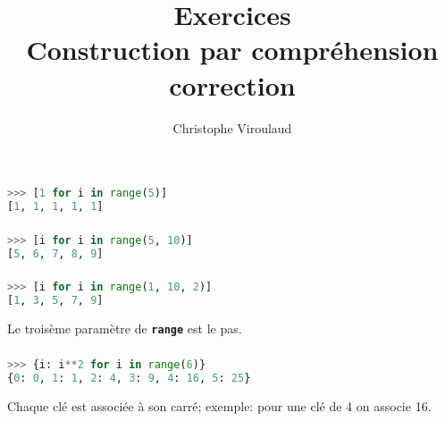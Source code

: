 \documentclass[svgnames,11pt]{beamer}
\author[]{Christophe Viroulaud}
\title{Exercices\\Construction par compréhension\\correction}
\date{\framebox{\textbf{DonRep 13}}}
\institute{Première - NSI}
\begin{document}
\begin{frame}
\titlepage
\end{frame}
\begin{frame}[fragile]
    \frametitle{}

\begin{center}
\begin{lstlisting}[language=Python , basicstyle=\ttfamily\small, xleftmargin=2em, xrightmargin=2em]
>>> [1 for i in range(5)]
[1, 1, 1, 1, 1]
\end{lstlisting}
\end{center}

\end{frame}
\begin{frame}[fragile]
    \frametitle{}

\begin{center}
\begin{lstlisting}[language=Python , basicstyle=\ttfamily\small, xleftmargin=2em, xrightmargin=2em]
>>> [i for i in range(5, 10)]
[5, 6, 7, 8, 9]
\end{lstlisting}
\end{center}

\end{frame}
\begin{frame}[fragile]
    \frametitle{}

\begin{center}
\begin{lstlisting}[language=Python , basicstyle=\ttfamily\small, xleftmargin=2em, xrightmargin=2em]
>>> [i for i in range(1, 10, 2)]
[1, 3, 5, 7, 9]
\end{lstlisting}
\end{center}
\begin{aretenir}[Remarque]
Le troisème paramètre de \textbf{\texttt{range}} est le pas.
\end{aretenir}
\end{frame}
\begin{frame}[fragile]
    \frametitle{}

\begin{center}
\begin{lstlisting}[language=Python , basicstyle=\ttfamily\small, xleftmargin=2em, xrightmargin=2em]
>>> {i: i**2 for i in range(6)}
{0: 0, 1: 1, 2: 4, 3: 9, 4: 16, 5: 25}
\end{lstlisting}
\end{center}
\begin{aretenir}[Remarque]
Chaque clé est associée à son carré; exemple: pour une clé de 4 on associe 16.
\end{aretenir}
\end{frame}
\end{document}
